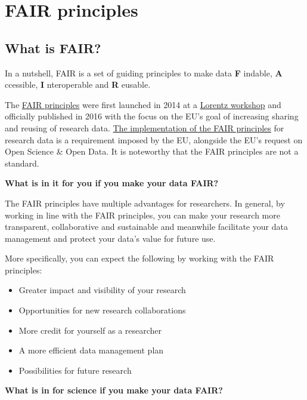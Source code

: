 \documentclass[
]{book}
\providecommand{\tightlist}{%
  \setlength{\itemsep}{0pt}\setlength{\parskip}{0pt}}
\begin{document}
\hypertarget{fair-principles}{%
\chapter{FAIR principles}\label{fair-principles}}

\hypertarget{what-is-fair}{%
\section{What is FAIR?}\label{what-is-fair}}

In a nutshell, FAIR is a set of guiding principles to make data \textbf{F} indable, \textbf{A} ccessible, \textbf{I} nteroperable and \textbf{R} eusable.

The \href{https://www.go-fair.org/fair-principles/}{FAIR principles} were first launched in 2014 at a \href{https://www.lorentzcenter.nl/}{Lorentz workshop} and officially published in 2016 with the focus on the EU's goal of increasing sharing and reusing of research data. \href{https://eur-lex.europa.eu/legal-content/EN/TXT/?uri=uriserv:OJ.L_.2019.172.01.0056.01.ENG}{The implementation of the FAIR principles} for research data is a requirement imposed by the EU, alongside the EU's request on Open Science \& Open Data. It is noteworthy that the FAIR principles are not a standard.

\textbf{What is in it for you if you make your data FAIR?}

The FAIR principles have multiple advantages for researchers. In general, by working in line with the FAIR principles, you can make your research more transparent, collaborative and sustainable and meanwhile facilitate your data management and protect your data's value for future use.

More specifically, you can expect the following by working with the FAIR principles:

\begin{itemize}
\tightlist
\item
  Greater impact and visibility of your research
\item
  Opportunities for new research collaborations
\item
  More credit for yourself as a researcher
\item
  A more efficient data management plan
\item
  Possibilities for future research
\end{itemize}

\textbf{What is in for science if you make your data FAIR?}
\end{document}
